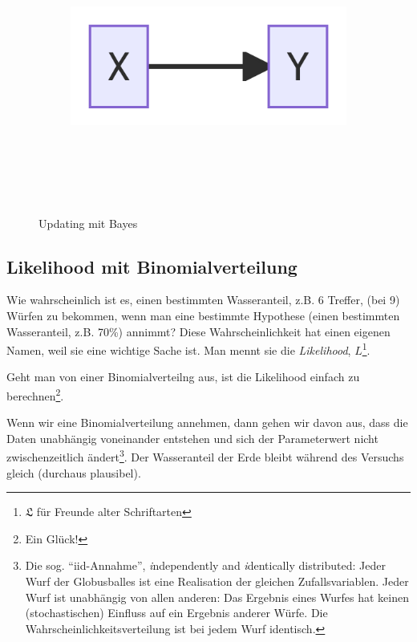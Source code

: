 \documentclass[
  a4paper,
  DIV=11]{scrreprt}
\theoremstyle{definition}
\theoremstyle{remark}
\begin{document}
\begin{figure}

{\centering 

\begin{figure}[H]

{\centering \includegraphics[width=5.5in,height=3.5in]{./Globusversuch_files/figure-latex/mermaid-figure-1.png}

}

\end{figure}

}

\caption{\label{fig-bayes-update}Updating mit Bayes}

\end{figure}

\hypertarget{likelihood-mit-binomialverteilung}{%
\subsection{Likelihood mit
Binomialverteilung}\label{likelihood-mit-binomialverteilung}}

Wie wahrscheinlich ist es, einen bestimmten Wasseranteil, z.B. 6
Treffer, (bei 9) Würfen zu bekommen, wenn man eine bestimmte Hypothese
(einen bestimmten Wasseranteil, z.B. 70\%) annimmt? Diese
Wahrscheinlichkeit hat einen eigenen Namen, weil sie eine wichtige Sache
ist. Man mennt sie die \emph{Likelihood}, \(L\)\footnote{\(\mathfrak{L}\)
  für Freunde alter Schriftarten}.

Geht man von einer Binomialverteilng aus, ist die Likelihood einfach zu
berechnen\footnote{Ein Glück!}.

Wenn wir eine Binomialverteilung annehmen, dann gehen wir davon aus,
dass die Daten unabhängig voneinander entstehen und sich der
Parameterwert nicht zwischenzeitlich ändert\footnote{Die sog.
  ``iid-Annahme'', \emph{i}ndependently and \emph{i}dentically
  distributed: Jeder Wurf der Globusballes ist eine Realisation der
  gleichen Zufallsvariablen. Jeder Wurf ist unabhängig von allen
  anderen: Das Ergebnis eines Wurfes hat keinen (stochastischen)
  Einfluss auf ein Ergebnis anderer Würfe. Die
  Wahrscheinlichkeitsverteilung ist bei jedem Wurf identisch.}. Der
Wasseranteil der Erde bleibt während des Versuchs gleich (durchaus
plausibel).
\end{document}
